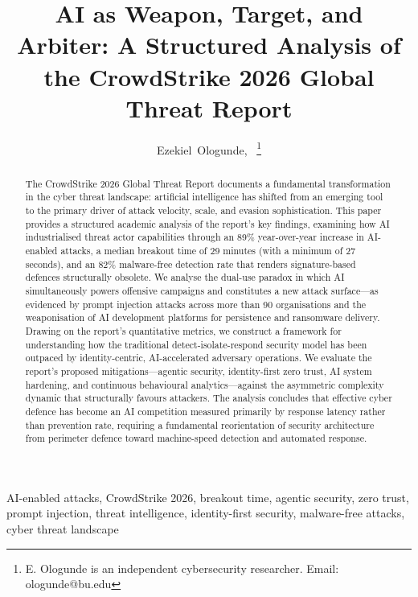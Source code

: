 \documentclass[journal]{IEEEtran}
\title{AI as Weapon, Target, and Arbiter: A Structured Analysis of the CrowdStrike 2026 Global Threat Report}
\author{Ezekiel~Ologunde,~\IEEEmembership{Independent~Researcher}
\thanks{E. Ologunde is an independent cybersecurity researcher. Email: ologunde@bu.edu}}
\begin{document}
\hfuzz=5pt
\maketitle

\begin{abstract}
The CrowdStrike 2026 Global Threat Report documents a fundamental transformation in
the cyber threat landscape: artificial intelligence has shifted from an emerging tool
to the primary driver of attack velocity, scale, and evasion sophistication. This
paper provides a structured academic analysis of the report's key findings, examining
how AI industrialised threat actor capabilities through an 89\% year-over-year
increase in AI-enabled attacks, a median breakout time of 29 minutes (with a minimum
of 27 seconds), and an 82\% malware-free detection rate that renders signature-based
defences structurally obsolete. We analyse the dual-use paradox in which AI
simultaneously powers offensive campaigns and constitutes a new attack surface---as
evidenced by prompt injection attacks across more than 90 organisations and the
weaponisation of AI development platforms for persistence and ransomware delivery.
Drawing on the report's quantitative metrics, we construct a framework for
understanding how the traditional detect-isolate-respond security model has been
outpaced by identity-centric, AI-accelerated adversary operations. We evaluate the
report's proposed mitigations---agentic security, identity-first zero trust,
AI system hardening, and continuous behavioural analytics---against the asymmetric
complexity dynamic that structurally favours attackers. The analysis concludes that
effective cyber defence has become an AI competition measured primarily by response
latency rather than prevention rate, requiring a fundamental reorientation of
security architecture from perimeter defence toward machine-speed detection and
automated response.
\end{abstract}

\begin{IEEEkeywords}
AI-enabled attacks, CrowdStrike 2026, breakout time, agentic security,
zero trust, prompt injection, threat intelligence, identity-first security,
malware-free attacks, cyber threat landscape
\end{IEEEkeywords}
\end{document}

